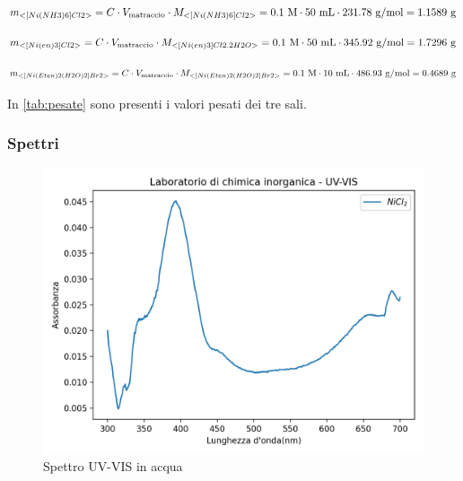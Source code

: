 \[ m_{<[Ni(NH3)6]Cl2>} = C \cdot V_{\text{matraccio}} \cdot M_{<[Ni(NH3)6]Cl2>}  = 0.1 \mathrm{\ M} \cdot 50 \mathrm{\ mL} \cdot 231.78 \mathrm{\ g/mol} = 1.1589 \mathrm{\ g} \]

\[ m_{<[Ni(en)3]Cl2>} = C \cdot V_{\text{matraccio}} \cdot M_{<[Ni(en)3]Cl2.2H2O>}  = 0.1 \mathrm{\ M} \cdot 50 \mathrm{\ mL} \cdot 345.92 \mathrm{\ g/mol} = 1.7296 \mathrm{\ g} \]

\[ m_{<[Ni(Eten)2(H2O)2]Br2>} = C \cdot V_{\text{matraccio}} \cdot M_{<[Ni(Eten)2(H2O)2]Br2>}  = 0.1 \mathrm{\ M} \cdot 10 \mathrm{\ mL} \cdot 486.93 \mathrm{\ g/mol} = 0.4689\mathrm{\ g} \]

In  \autoref{tab:pesate} sono presenti i valori pesati dei tre sali.
\subsubsection{Spettri}


\begin{figure}[ht!]
    \centering
    \includegraphics{Relazione/foto/nicl2uv.png}
    
    \caption{Spettro UV-VIS  in acqua}
    \label{fig:nicl2uv}
\end{figure}

